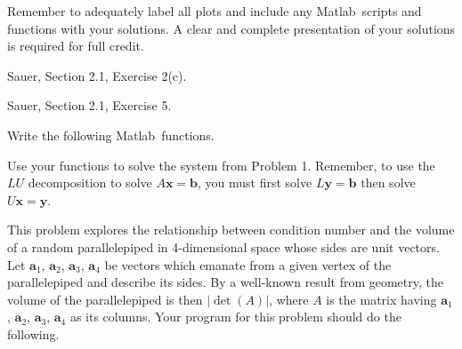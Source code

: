 \documentclass[12pt]{exam}
\renewcommand*{\vec}[1]{\boldsymbol{#1}}
\newcommand{\matlab}{{\sc Matlab}}
\begin{document}
Remember to adequately label all plots and include any \matlab~scripts and functions with your solutions. A clear and complete presentation of your solutions is required for full credit.
\begin{questions}

\question Sauer, Section 2.1, Exercise 2(c).

\question Sauer, Section 2.1, Exercise 5.

\question Write the following \matlab~functions.


Use your functions to solve the system from Problem 1. Remember, to use the $LU$ decomposition to solve $A\vec{x} = \vec{b}$, you must first solve $L\vec{y} = \vec{b}$ then solve $U\vec{x} = \vec{y}$.

\question This problem explores the relationship between condition number and the volume of a random parallelepiped in 4-dimensional space whose sides are unit vectors. Let $\vec{a}_1$, $\vec{a}_2$, $\vec{a}_3$, $\vec{a}_4$ be vectors which emanate from a given vertex of the parallelepiped and describe its sides. By a well-known result from geometry, the volume of the parallelepiped is then $|\det(A)|$, where $A$ is the matrix having $\vec{a}_1$, $\vec{a}_2$, $\vec{a}_3$, $\vec{a}_4$ as its columns. Your program for this problem should do the following.

\end{questions}
\end{document}

